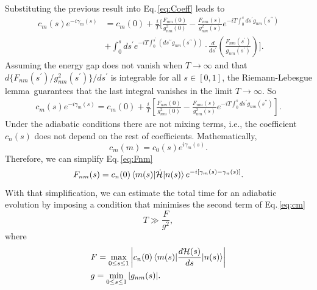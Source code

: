  Substituting the previous result into Eq.\,\eqref{eq:Coeff} leads to
 \begin{equation}
 \begin{split}
      c_{m}(s)e^{-i\gamma_{m}(s)} & = c_{m}(0) + \frac{i}{T}\Biggr[\frac{F_{nm}(0)}{g^{2}_{nm}(0)} - \frac{F_{nm}(s)}{g^{2}_{nm}(s)}e^{-iT\int_{0}^{s}ds^{\prime}g_{nm}(s^{\prime \prime})} \\
      & + \int_{0}^{s}ds^{\prime} e^{-iT\int_{0}^{s^{\prime}}\left(ds^{\prime \prime}g_{nm}(s^{\prime\prime}) \right)} \cdot \frac{d}{ds^{\prime}}\left(\frac{F_{nm}(s^{\prime})}{g_{nm}(s^{\prime})}\right)\Biggr].
\end{split}
\end{equation}
 Assuming the energy gap does not vanish when $T \rightarrow \infty$ and that $d\{F_{nm}(s^{\prime})/g_{nm}^{2}(s^{\prime})\}/ds^{\prime}$ is integrable for all $s \in [0,1]$, the Riemann-Lebesgue lemma\,\cite{BrownChurchill} guarantees that the last integral vanishes in the limit $T \rightarrow \infty$. So
  \begin{align}
  \label{eq:cm}
     c_{m}(s)e^{-i\gamma_{m}(s)} = c_{m}(0) + \frac{i}{T}\left[\frac{F_{nm}(0)}{g^{2}_{nm}(0)} - \frac{F_{nm}(s)}{g^{2}_{nm}(s)}e^{-iT\int_{0}^{s}ds^{\prime}g_{nm}(s^{\prime \prime})}\right].
 \end{align}
 Under the adiabatic conditions there are not mixing terms, i.e., the coefficient $c_{n}(s)$ does not depend on the rest of coefficients. Mathematically,
\begin{equation}
    c_{m}(m) = c_{0}(s)e^{i\gamma_{m}(s)}.
\end{equation}
Therefore, we can simplify Eq.\,\eqref{eq:Fnm}
\begin{equation}
    F_{nm}(s) = c_{n}(0)\braket{m(s)|\dot{\mathcal{H}}|n(s)} e^{-i\left[\gamma_{m}(s) - \gamma_{n}(s)\right]}.
\end{equation}
 With that simplification, we can estimate the total time for an adiabatic evolution by imposing a condition that minimises the second term of Eq.\,\eqref{eq:cm}
 \begin{equation}
     T \gg \frac{F}{g^{2}},
 \end{equation}
 where
 \begin{align}
     &F = \max_{0 \leq s \leq 1} \left|c_{n}(0)\braket{m(s)|\frac{d\mathcal{H}(s)}{ds}| n(s)}\right| \\
     &g = \min_{0 \leq s \leq 1} |g_{nm}(s)|.
 \end{align}
